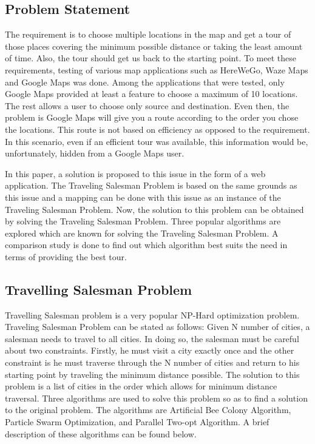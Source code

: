 \documentclass[conference]{IEEEtran}
\begin{document}
\subsection {Problem Statement}

The requirement is to choose multiple locations in the map and get a tour of those places covering the minimum possible distance or taking the least amount of time. Also, the tour should get us back to the starting point. To meet these requirements, testing of various map applications such as HereWeGo, Waze Maps and Google Maps was done. Among the applications that were tested, only Google Maps provided at least a feature to choose a maximum of 10 locations. The rest allows a user to choose only source and destination. Even then, the problem is Google Maps will give you a route according to the order you chose the locations. This route is not based on efficiency as opposed to the requirement. In this scenario, even if an efficient tour was available, this information would be, unfortunately, hidden from a Google Maps user. 

In this paper, a solution is proposed to this issue in the form of a web application. The Traveling Salesman Problem is based on the same grounds as this issue and a mapping can be done with this issue as an instance of the Traveling Salesman Problem. Now, the solution to this problem can be obtained by solving the Traveling Salesman Problem. Three popular algorithms are explored which are known for solving the Traveling Salesman Problem. A comparison study is done to find out which algorithm best suits the need in terms of providing the best tour.


\subsection {Travelling Salesman Problem}

Travelling Salesman problem is a very popular NP-Hard optimization problem. Traveling Salesman Problem can be stated as follows: Given N number of cities, a salesman needs to travel to all cities. In doing so, the salesman must be careful about two constraints. Firstly, he must visit a city exactly once and the other constraint is he must traverse through the N number of cities and return to his starting point by traveling the minimum distance possible. The solution to this problem is a list of cities in the order which allows for minimum distance traversal. Three algorithms are used to solve this problem so as to find a solution to the original problem. The algorithms are Artificial Bee Colony Algorithm, Particle Swarm Optimization, and Parallel Two-opt Algorithm. A brief description of these algorithms can be found below.
\end{document}
